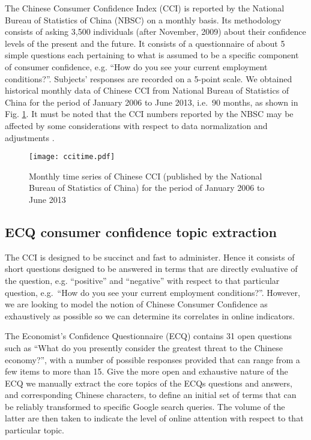 \documentclass[10pt]{article}
\begin{document}
	The Chinese Consumer Confidence Index (CCI) is reported by the National Bureau of Statistics of China (NBSC) on a monthly basis. Its methodology consists
	of asking 3,500 individuals (after November, 2009) about their confidence levels of the present and the future. It consists of a questionnaire
	of about 5 simple questions each pertaining to what is assumed to be a specific component of consumer confidence, e.g. ``How do you see your current employment conditions?''.  Subjects' responses are recorded on a 5-point scale. We obtained historical monthly data of Chinese CCI from National Bureau of Statistics of China
	for the period of January 2006 to June 2013, i.e.~90 months, as shown in Fig. \ref{CCImonthly}. It must be noted that the CCI numbers 
	reported by the NBSC may be affected by some considerations with respect to data normalization and adjustments \cite{Center2010}.\\

	\begin{figure}[h!]
		\begin{center}
			\texttt{[image: ccitime.pdf]}
\end{center}
		\caption{\label{CCImonthly}Monthly time series of Chinese CCI (published by the National Bureau of Statistics of China)
							for the period of January 2006 to June 2013}
	\end{figure}

	
	\subsection*{ECQ  consumer confidence topic extraction}
	The CCI is designed to be succinct and fast to administer. Hence it consists of short questions designed to be answered in terms that are directly evaluative
	of the question, e.g. ``positive'' and ``negative'' with respect to that particular question, e.g.~``How do you see your current employment conditions?''.
	However, we are looking to model the notion of Chinese Consumer Confidence as
	exhaustively as possible so we can determine its correlates in online indicators.
	
	The Economist's Confidence Questionnaire (ECQ) contains 
	31 open questions such as ``What do you presently consider the greatest threat to the Chinese economy?'', with a number
	of possible responses provided that can range from a few items to more than 15. Give the more open and exhaustive nature
	of the ECQ we manually extract the core topics of the ECQs questions and answers, and corresponding Chinese characters, to define an initial set of terms that can
	be reliably transformed to specific Google search queries. The volume of the latter are then taken to indicate the level of online attention with respect to that particular topic.\\
	
\end{document}
